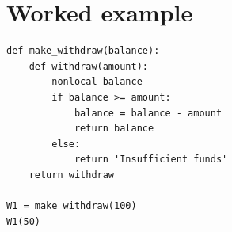 
\section*{Worked example}

\begin{lstlisting}
def make_withdraw(balance):
    def withdraw(amount):
        nonlocal balance
        if balance >= amount:
            balance = balance - amount
            return balance
        else:
            return 'Insufficient funds'
    return withdraw

W1 = make_withdraw(100)
W1(50)
\end{lstlisting}

